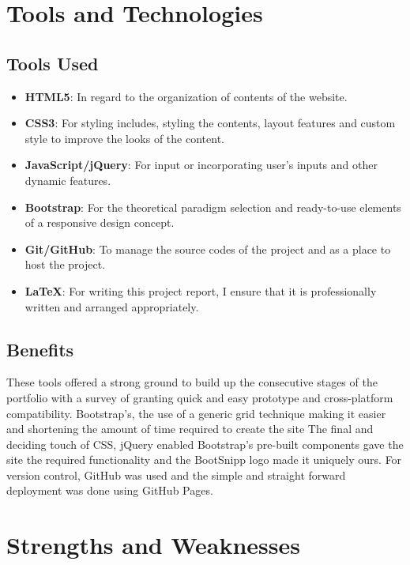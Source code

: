 \documentclass{article}
\begin{document}
\section{Tools and Technologies}
\subsection{Tools Used}
\begin{itemize}
\item \textbf{HTML5}: In regard to the organization of contents of the website.
\item \textbf{CSS3}: For styling includes, styling the contents, layout features and custom style to improve the looks of the content.
\item \textbf{JavaScript/jQuery}: For input or incorporating user’s inputs and other dynamic features.
\item \textbf{Bootstrap}: For the theoretical paradigm selection and ready-to-use elements of a responsive design concept.
\item \textbf{Git/GitHub}: To manage the source codes of the project and as a place to host the project.
\item \textbf{LaTeX}: For writing this project report, I ensure that it is professionally written and arranged appropriately.
\end{itemize}

\subsection{Benefits}
These tools offered a strong ground to build up the consecutive stages of the portfolio with a survey of granting quick and easy prototype and cross-platform compatibility. Bootstrap’s, the use of a generic grid technique making it easier and shortening the amount of time required to create the site The final and deciding touch of CSS, jQuery enabled Bootstrap’s pre-built components gave the site the required functionality and the BootSnipp logo made it uniquely ours. For version control, GitHub was used and the simple and straight forward deployment was done using GitHub Pages.

\section{Strengths and Weaknesses}
\end{document}
